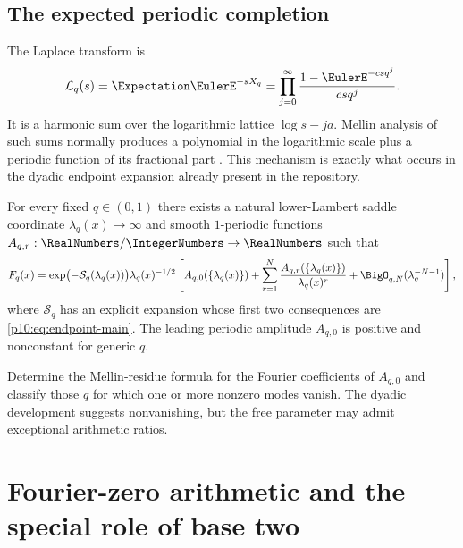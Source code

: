 \documentclass[11pt]{article}
\numberwithin{equation}{section}
\theoremstyle{definition}
\theoremstyle{remark}
\begin{document}
\subsection{The expected periodic completion}

The Laplace transform is
\begin{equation}
 \mathcal L_q(s)=\Expectation\EulerE^{-sX_q}
 =\prod_{j=0}^{\infty}\frac{1-\EulerE^{-csq^j}}{csq^j}.          \label{p10:eq:laplace-product}
\end{equation}
It is a harmonic sum over the logarithmic lattice $\log s-ja$.  Mellin analysis of such
sums normally produces a polynomial in the logarithmic scale plus a periodic function of its
fractional part \cite{p10:flajolet1995}.  This mechanism is exactly what occurs in the dyadic
endpoint expansion already present in the repository.

\begin{conjecture}
\label{p10:conj:q-transseries}
For every fixed $q\in(0,1)$ there exists a natural lower-Lambert saddle coordinate
$\lambda_q(x)\to\infty$ and smooth $1$-periodic functions
$A_{q,r}:\RealNumbers/\IntegerNumbers\to\RealNumbers$ such that
\begin{equation}
 F_q(x)
 =\exp\bigl(-\mathcal S_q(\lambda_q(x))\bigr)
  \lambda_q(x)^{-1/2}
  \left[
   A_{q,0}(\{\lambda_q(x)\})
   +\sum_{r=1}^{N}\frac{A_{q,r}(\{\lambda_q(x)\})}{\lambda_q(x)^r}
   +\BigO_{q,N}(\lambda_q^{-N-1})
  \right],                                                  \label{p10:eq:q-transseries}
\end{equation}
where $\mathcal S_q$ has an explicit expansion whose first two consequences are
\eqref{p10:eq:endpoint-main}.  The leading periodic amplitude $A_{q,0}$ is positive and
nonconstant for generic $q$.
\end{conjecture}

\begin{problem}
Determine the Mellin-residue formula for the Fourier coefficients of $A_{q,0}$ and classify
those $q$ for which one or more nonzero modes vanish.  The dyadic development suggests
nonvanishing, but the free parameter may admit exceptional arithmetic ratios.
\end{problem}

\section{Fourier-zero arithmetic and the special role of base two}
\label{p10:sec:zeros}
\end{document}
